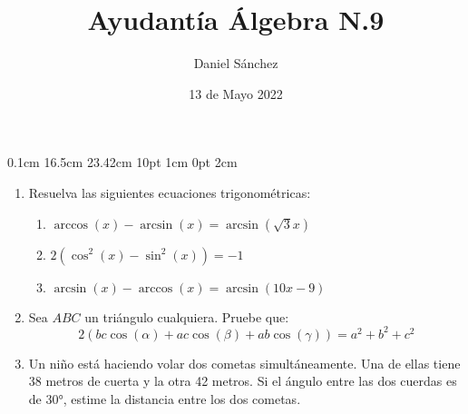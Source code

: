 \documentclass[12pt]{article}
\begin{document}
\setmargins{2.5cm}
{0.1cm}
{16.5cm}
{23.42cm}
{10pt}
{1cm}
{0pt}
{2cm}

\title{Ayudant\'ia \'Algebra N.9}
\date{13 de Mayo 2022}
\author{Daniel S\'anchez}
\maketitle

\begin{enumerate}
      \item Resuelva las siguientes ecuaciones trigonom\'etricas:
            \begin{enumerate}
                  \item $\arccos(x) - \arcsin(x) = \arcsin(\sqrt{3}x)$
                  \item $2(\cos^2(x) - \sin^2(x)) = -1$
                  \item $\arcsin(x) - \arccos(x) = \arcsin(10x-9)$
            \end{enumerate}
      \item Sea $ABC$ un tri\'angulo cualquiera. Pruebe que:
            $$2(bc\cos(\alpha)+ac\cos(\beta)+ab\cos(\gamma)) = a^2+b^2+c^2$$
      \item Un niño est\'a haciendo volar dos cometas simult\'aneamente. Una de ellas tiene 38
            metros de cuerta y la otra 42 metros. Si el \'angulo entre las dos cuerdas es de 30°,
            estime la distancia entre los dos cometas.
\end{enumerate}
\end{document}
